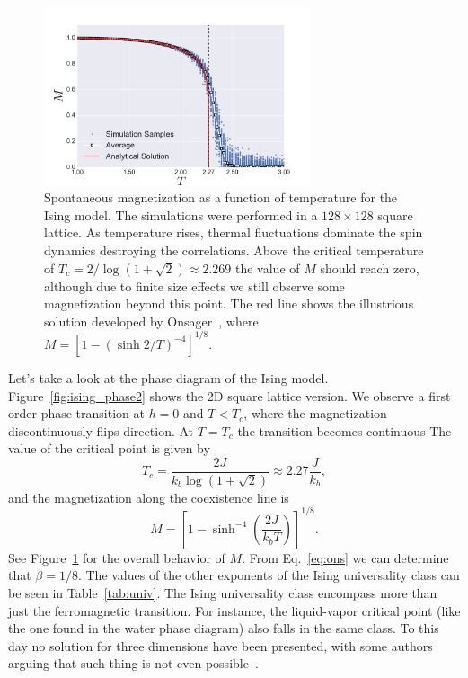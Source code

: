 \begin{figure}[t]
\begin{center}
    \includegraphics[width=0.7\textwidth]{chapters/ch2-crit/figs/ising_phase}
\end{center}
\caption{Spontaneous magnetization as a function of temperature for the Ising
    model. The simulations were performed in a $128\times128$ square lattice.
    As temperature rises, thermal fluctuations dominate the spin dynamics
    destroying the correlations. Above the critical temperature of
    $T_c=2/\log(1+\sqrt{2})\approx 2.269$ the value of $M$ should reach zero,
    although due to finite size effects we still observe some magnetization
    beyond this point. The red line shows the illustrious solution
    developed by Onsager~\cite{Onsager1944}, where
    $M={[1-{(\sinh{2/T})}^{-4}]}^{1/8}$.}
\label{fig:ising_phase}
\end{figure}

Let's take a look at the phase diagram of the Ising model.
Figure~\ref{fig:ising_phase2} shows the 2D square lattice version. We observe a
first order phase transition at $h=0$ and $T<T_c$, where the magnetization
discontinuously flips direction. At $T=T_c$ the transition becomes continuous
The value of the critical point is given by
\begin{equation}
    T_{c}=
    \frac{2J}{k_{b}\log\left(1+\sqrt{2}\right)}
    \approx2.27\frac{J}{k_{b}},
\end{equation}
and the magnetization along the coexistence line is~\cite{Yang1952}
\begin{equation}
    \label{eq:ons}
    M={\left[1-\sinh^{-4}\left(\frac{2J}{k_{b}T}\right)\right]}^{1/8}.
\end{equation}
See Figure~\ref{fig:ising_phase} for the overall behavior of $M$.
From Eq.~\ref{eq:ons} we can determine that $\beta=1/8$. The values of the
other exponents of the Ising universality class can be seen in
Table~\ref{tab:univ}. The Ising universality class encompass more than just the
ferromagnetic transition. For instance, the liquid-vapor critical point (like
the one found in the water phase diagram) also falls in the same class. To this
day no solution for three dimensions have been presented, with some authors
arguing that such thing is not even possible~\cite{Istrail2000}.

